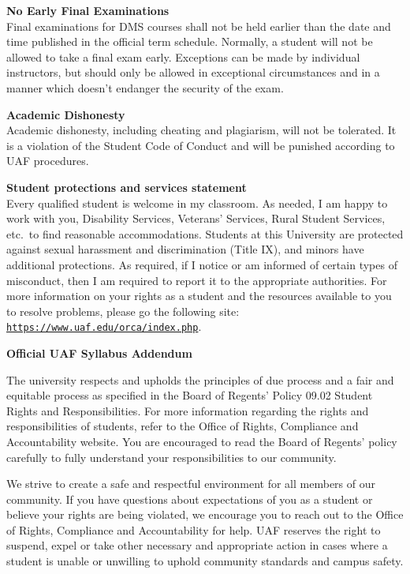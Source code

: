 \documentclass[12pt]{article}
\renewcommand{\emph}[1]{\textsf{\textbf{#1}}}
\newcommand{\localhead}[1]{\par\smallskip\textbf{#1}\nobreak\\}%
\def\subheading#1{\localhead{\emph{#1}}}
\begin{document}
\subheading{No Early Final Examinations}
Final examinations for DMS
  courses shall not be held earlier than the date and time published
  in the official term schedule. Normally, a student will not be
  allowed to take a final exam early. Exceptions can be made by
  individual instructors, but should only be allowed in exceptional
  circumstances and in a manner which doesn't endanger the security of
  the exam.

\subheading{Academic Dishonesty}
Academic dishonesty, including cheating and plagiarism, will not
be tolerated.  It is a violation of the Student Code of Conduct
and will be punished according to UAF procedures.


\subheading{Student protections and services statement}
Every qualified student is welcome in my classroom.  As needed, I am happy to work with you, Disability Services, Veterans' Services, Rural Student Services, etc.~to find reasonable accommodations.  Students at this University are protected against sexual harassment and discrimination (Title IX), and minors have additional protections.  As required, if I notice or am informed of certain types of misconduct, then I am required to report it to the appropriate authorities.  For more information on your rights as a student and the resources available to you to resolve problems, please go the following site: \href{https://www.uaf.edu/orca/index.php}{\texttt{https://www.uaf.edu/orca/index.php}}.


\strut
\begin{center}
\textbf{\large{Official UAF Syllabus Addendum}}
\end{center}


 The university respects and upholds the principles of due process and a fair and equitable process as specified in the Board of Regents' Policy 09.02 Student Rights and Responsibilities. For more information regarding the rights and responsibilities of students, refer to the Office of Rights, Compliance and Accountability website. You are encouraged to read the Board of Regents' policy carefully to fully understand your responsibilities to our community.

We strive to create a safe and respectful environment for all members of our community. If you have questions about expectations of you as a student or believe your rights are being violated, we encourage you to reach out to the  Office of Rights, Compliance and Accountability for help. UAF reserves the right to suspend, expel or take other necessary and appropriate action in cases where a student is unable or unwilling to uphold community standards and campus safety.
\end{document}
